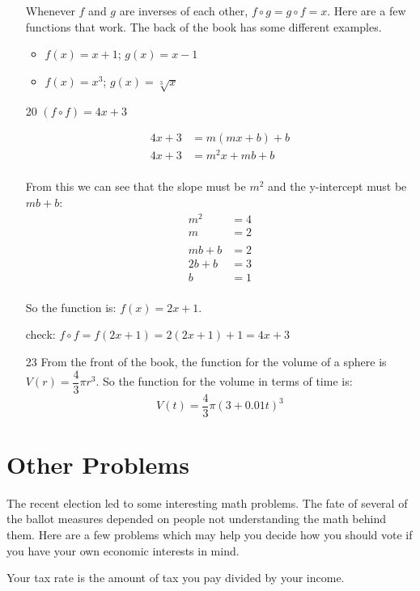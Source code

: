 \documentclass[fleqn,addpoints]{exam}
\begin{document}
\begin{itemize}
Whenever $f$ and $g$ are inverses of each other, $f \circ g = g \circ f = x$.  Here are a few functions that work.  The
back of the book has some different examples.
\begin{itemize}
  \item $f(x) = x+1$; $g(x) = x-1$
  \item $f(x) = x^3$; $g(x) = \sqrt[3]{x}$
\end{itemize}

\pagebreak

\item[20]
$(f \circ f) = 4x+3$

\begin{align*}
  4x+ 3 &= m(mx+b)+b \\
  4x+ 3 &= m^2x+mb+b \\
\end{align*}

From this we can see that the slope must be $m^2$ and the y-intercept must be $mb+b$:
\begin{align*}
  m^2 &= 4 \\
  m &= 2 \\
  \\
  mb+b &= 2 \\
  2b+b &= 3 \\
  b &= 1 \\
\end{align*}

So the function is: $f(x) = 2x+1$.

check: $f \circ f = f(2x+1) = 2(2x+1) + 1 = 4x+3$


\item[23]
From the front of the book, the function for the volume of a sphere is $V(r) = \dfrac{4}{3} \pi r^3$.  So the function
for the volume in terms of time is:
\[
  V(t) = \dfrac{4}{3} \pi (3 + 0.01t)^3
\]

\end{itemize}

\section{Other Problems}

The recent election led to some interesting math problems.  The fate of several of the ballot measures depended on
people not understanding the math behind them.  Here are a few problems which may help you decide how you should vote if
you have your own economic interests in mind.

Your tax rate is the amount of tax you pay divided by your income.
\end{document}
